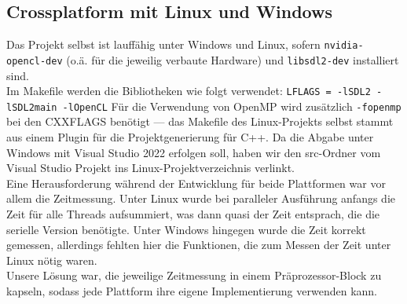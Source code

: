 \subsection{Crossplatform mit Linux und Windows}
Das Projekt selbst ist lauffähig unter Windows und Linux, sofern \lstinline{nvidia-opencl-dev} (o.ä. für die jeweilig verbaute Hardware) 
und \lstinline{libsdl2-dev} installiert sind. \\
Im Makefile werden die Bibliotheken wie folgt verwendet: \lstinline{LFLAGS = -lSDL2 -lSDL2main -lOpenCL} 
Für die Verwendung von OpenMP wird zusätzlich \lstinline{-fopenmp} bei den CXXFLAGS benötigt --- das Makefile des Linux-Projekts 
selbst stammt aus einem Plugin für die Projektgenerierung für C++.  
Da die Abgabe unter Windows mit Visual Studio 2022 erfolgen soll, haben wir den src-Ordner vom Visual Studio Projekt ins 
Linux-Projektverzeichnis verlinkt. \\
Eine Herausforderung während der Entwicklung für beide Plattformen war vor allem die Zeitmessung. Unter Linux wurde bei 
paralleler Ausführung anfangs die Zeit für alle Threads aufsummiert, was dann quasi der Zeit entsprach, die die serielle Version
benötigte. Unter Windows hingegen wurde die Zeit korrekt gemessen, allerdings fehlten hier die Funktionen, die zum Messen der 
Zeit unter Linux nötig waren.\\
Unsere Lösung war, die jeweilige Zeitmessung in einem Präprozessor-Block zu kapseln, sodass jede Plattform ihre eigene
Implementierung verwenden kann. 

